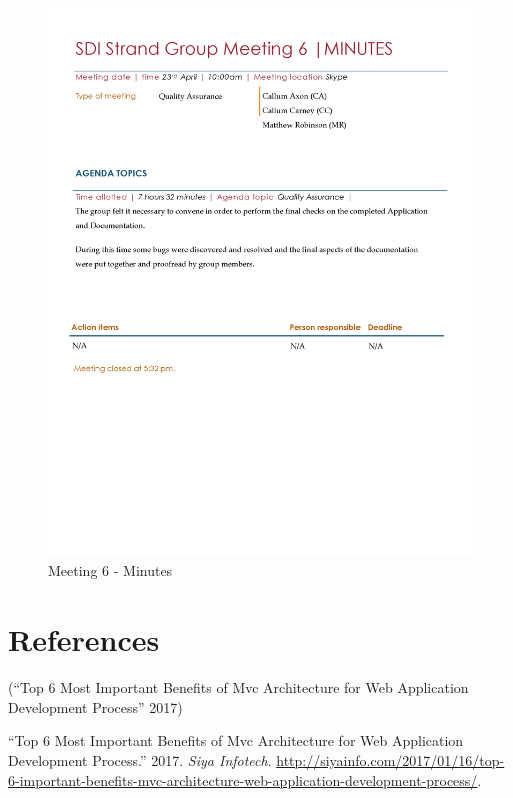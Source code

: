 \documentclass[
  english,
  a4paper,
,tablecaptionabove
]{scrartcl}
\begin{document}
\begin{figure}
\centering
\includegraphics{images/meeting-minutes/meeting-6.png}
\caption{Meeting 6 - Minutes}
\end{figure}

\hypertarget{references}{%
\section{References}\label{references}}

(``Top 6 Most Important Benefits of Mvc Architecture for Web Application
Development Process'' 2017)

\hypertarget{refs}{}
\leavevmode\hypertarget{ref-infotech_2017}{}%
``Top 6 Most Important Benefits of Mvc Architecture for Web Application
Development Process.'' 2017. \emph{Siya Infotech}.
\url{http://siyainfo.com/2017/01/16/top-6-important-benefits-mvc-architecture-web-application-development-process/}.
\end{document}
